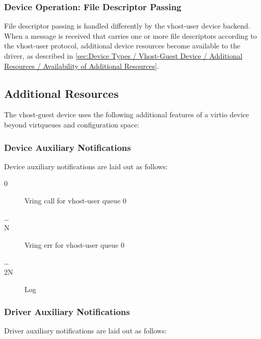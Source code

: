 \subsubsection{Device Operation: File Descriptor Passing}\label{sec:Device Types / Vhost-Guest Device / Device Operation / Device Operation: File Descriptor Passing}

File descriptor passing is handled differently by the vhost-user
device backend. When a message is received that carries one
or more file descriptors according to the vhost-user protocol,
additional device resources become available to the driver, as
described in \ref{sec:Device Types / Vhost-Guest Device / Additional Resources / Availability of Additional Resources}.

\subsection{Additional Resources}\label{sec:Device Types / Vhost-Guest Device / Additional Resources}

The vhost-guest device uses the following additional features of
a virtio device beyond virtqueues and configuration space:

\subsubsection{Device Auxiliary Notifications}\label{sec:Device Types / Vhost-Guest Device / Additional Resources / Device Auxiliary Notifications}

Device auxiliary notifications are laid out as follows:

\begin{description}
\item[0] Vring call for vhost-user queue 0
\item[\ldots]
\item[N] Vring err for vhost-user queue 0
\item[\ldots]
\item[2N] Log
\end{description}

\subsubsection{Driver Auxiliary Notifications}\label{sec:Device Types / Vhost-Guest Device / Additional Resources / Driver Auxiliary Notifications}

Driver auxiliary notifications are laid out as follows:

